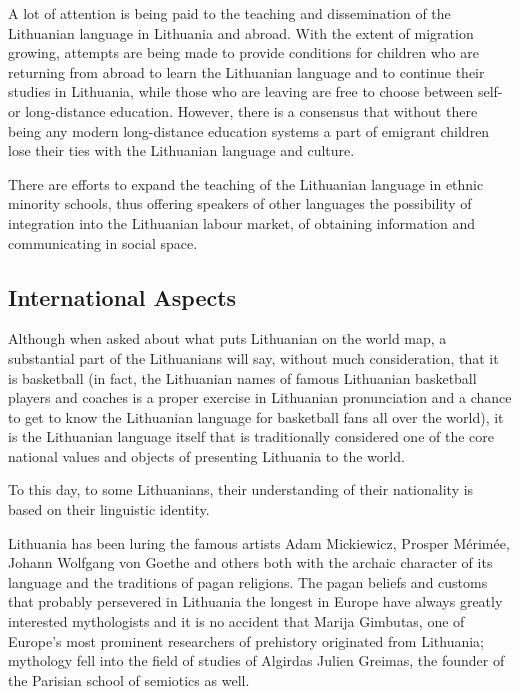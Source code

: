 \documentclass[]{../metanetpaper}
\begin{document}
\begin{multicols}{2}
A lot of attention is being paid to the teaching and dissemination of the Lithuanian language in Lithuania and abroad. With the extent of migration growing, attempts are being made to provide conditions for children who are returning from abroad to learn the Lithuanian language and to continue their studies in Lithuania, while those who are leaving are free to choose between self- or long-distance education.  However, there is a consensus that without there being any modern long-distance education systems a part of emigrant children lose their ties with the Lithuanian language and culture.

There are efforts to expand the teaching of the Lithuanian language in ethnic minority schools, thus offering speakers of other languages the possibility of integration into the Lithuanian labour market, of obtaining information and communicating in social space.

\subsection{International Aspects}

Although when asked about what puts Lithuanian on the world map, a substantial part of the Lithuanians will say, without much consideration, that it is basketball (in fact, the Lithuanian names of famous Lithuanian basketball players and coaches is a proper exercise in Lithuanian pronunciation and a chance to get to know the Lithuanian language for basketball fans all over the world), it is the Lithuanian language itself that is traditionally considered one of the core national values and objects of presenting Lithuania to the world.

    To this day, to some Lithuanians, their understanding of their nationality is based on their linguistic identity.


Lithuania has been luring the famous artists Adam Mickiewicz, Prosper Mérimée, Johann Wolfgang von Goethe and others both with the archaic character of its language and the traditions of pagan religions. The pagan beliefs and customs that probably persevered in Lithuania the longest in Europe have always greatly interested mythologists and it is no accident  that Marija Gimbutas, one of Europe’s most prominent researchers of  prehistory originated from Lithuania; mythology fell into the field of studies of Algirdas Julien Greimas, the founder of the Parisian school of semiotics as well.


\end{multicols}
\end{document}
